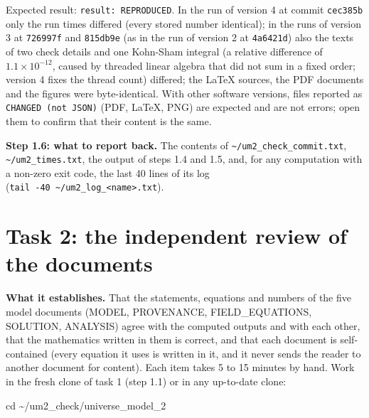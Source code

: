\documentclass[
  10pt,
]{article}
\newenvironment{Shaded}{}{}
\newcommand{\NormalTok}[1]{#1}
\begin{document}
Expected result: \texttt{result:\ REPRODUCED}. In the run of version 4
at commit \texttt{cec385b} only the run times differed (every stored
number identical); in the runs of version 3 at \texttt{726997f} and
\texttt{815db9e} (as in the run of version 2 at \texttt{4a6421d}) also
the texts of two check details and one Kohn-Sham integral (a relative
difference of \(1.1\times10^{-12}\), caused by threaded linear algebra
that did not sum in a fixed order; version 4 fixes the thread count)
differed; the LaTeX sources, the PDF documents and the figures were
byte-identical. With other software versions, files reported as
\texttt{CHANGED\ (not\ JSON)} (PDF, LaTeX, PNG) are expected and are not
errors; open them to confirm that their content is the same.

\textbf{Step 1.6: what to report back.} The contents of
\texttt{\textasciitilde{}/um2\_check\_commit.txt},
\texttt{\textasciitilde{}/um2\_times.txt}, the output of steps 1.4 and
1.5, and, for any computation with a non-zero exit code, the last 40
lines of its log
(\texttt{tail\ -40\ \textasciitilde{}/um2\_log\_\textless{}name\textgreater{}.txt}).

\hypertarget{task-2-the-independent-review-of-the-documents}{%
\section{Task 2: the independent review of the
documents}\label{task-2-the-independent-review-of-the-documents}}

\textbf{What it establishes.} That the statements, equations and numbers
of the five model documents (MODEL, PROVENANCE, FIELD\_EQUATIONS,
SOLUTION, ANALYSIS) agree with the computed outputs and with each other,
that the mathematics written in them is correct, and that each document
is self-contained (every equation it uses is written in it, and it never
sends the reader to another document for content). Each item takes 5 to
15 minutes by hand. Work in the fresh clone of task 1 (step 1.1) or in
any up-to-date clone:

\begin{Shaded}
\begin{Highlighting}[]
\NormalTok{cd \textasciitilde{}/um2\_check/universe\_model\_2}
\end{Highlighting}
\end{Shaded}
\end{document}
